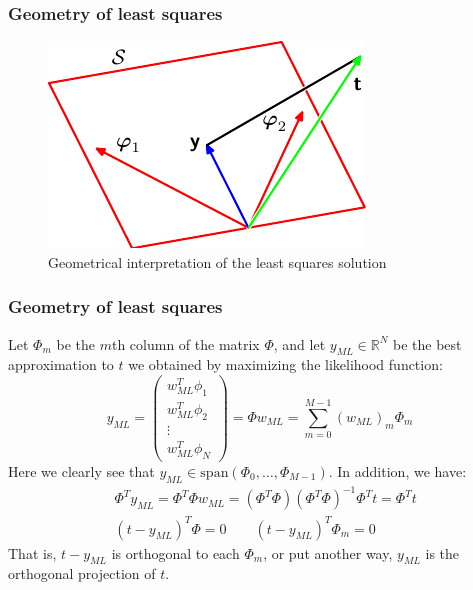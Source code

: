 \documentclass{beamer}
\begin{document}
\begin{frame}
    \frametitle{Geometry of least squares}
    \begin{figure}
        \caption{Geometrical interpretation of the least squares solution}
        \includegraphics{Figure_3.pdf}
    \end{figure}
\end{frame}

\begin{frame}
    \frametitle{Geometry of least squares}
    Let $\Phi_{m}$ be the $m$th column of the matrix $\Phi$, and let $y_{ML}\in\mathbb{R}^{N}$ be the best approximation to $t$ we obtained by maximizing the likelihood function:
    \begin{equation*}
        y_{ML}=\begin{pmatrix}
            w_{ML}^{T}\phi_{1} \\
            w_{ML}^{T}\phi_{2} \\
            \vdots \\
            w_{ML}^{T}\phi_{N}
        \end{pmatrix}=\Phi{}w_{ML}=\sum_{m=0}^{M-1}(w_{ML})_{m}\Phi_{m}
    \end{equation*}
    Here we clearly see that $y_{ML}\in\mathrm{span}(\Phi_{0},\hdots,\Phi_{M-1})$. In addition, we have:
    \begin{align*}
        &\Phi^{T}y_{ML}=\Phi^{T}\Phi{}w_{ML}=(\Phi^{T}\Phi{})(\Phi^{T}\Phi)^{-1}\Phi^{T}t=\Phi^{T}t \\
        &(t-y_{ML})^{T}\Phi=0\qquad(t-y_{ML})^{T}\Phi_{m}=0
    \end{align*}
    That is, $t-y_{ML}$ is orthogonal to each $\Phi_{m}$, or put another way, $y_{ML}$ is the orthogonal projection of $t$.
\end{frame}
\end{document}
